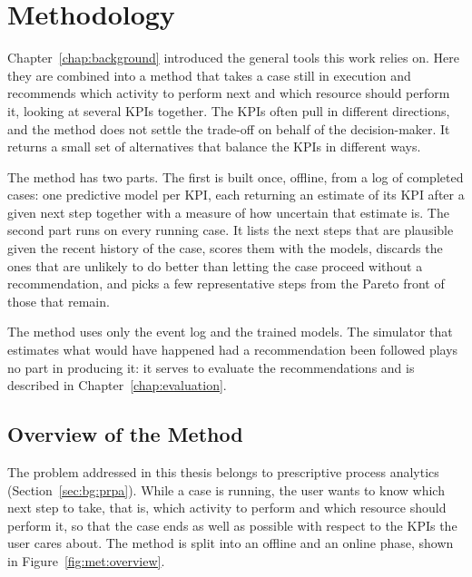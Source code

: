 \chapter{Methodology}
\label{chap:methodology}
Chapter~\ref{chap:background} introduced the general tools this work relies
on. Here they are combined into a method that takes a case still in
execution and recommends which activity to perform next and which resource
should perform it, looking at several KPIs together. The KPIs often pull in
different directions, and the method does not settle the trade-off on behalf
of the decision-maker. It returns a small set of alternatives that balance
the KPIs in different ways.

The method has two parts. The first is built once, offline, from a log of
completed cases: one predictive model per KPI, each returning an estimate of
its KPI after a given next step together with a measure of how uncertain
that estimate is. The second part runs on every running case. It lists the
next steps that are plausible given the recent history of the case, scores
them with the models, discards the ones that are unlikely
to do better than letting the case proceed without a recommendation, and
picks a few representative steps from the Pareto front of those that remain.

The method uses only the event log and the trained models. The simulator
that estimates what would have happened had a recommendation been followed
plays no part in producing it: it serves to evaluate the recommendations and
is described in Chapter~\ref{chap:evaluation}.



\section{Overview of the Method}
\label{sec:met:overview}
The problem addressed in this thesis belongs to prescriptive process
analytics (Section~\ref{sec:bg:prpa}). While a case is running, the user
wants to know which next step to take, that is, which activity to perform
and which resource should perform it, so that the case ends as well as
possible with respect to the KPIs the user cares about. The method is split
into an offline and an online phase, shown in
Figure~\ref{fig:met:overview}.

